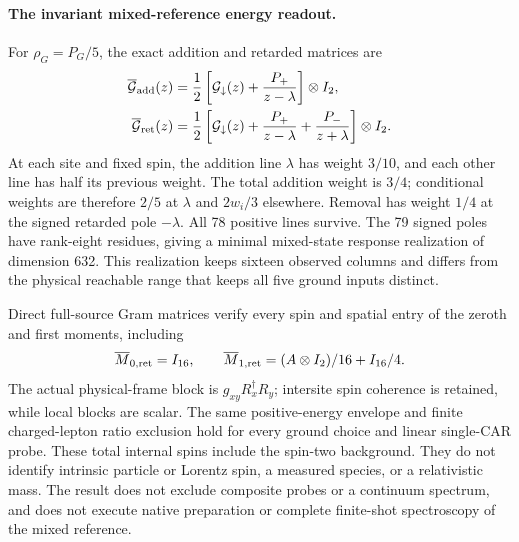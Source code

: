 \paragraph{The invariant mixed-reference energy readout.}
For $\rho_G=P_G/5$, the exact addition and retarded matrices are
\begin{align*}
 \overline{\mathcal G}_{\rm add}(z)
 &=\frac12\left[\mathcal G_\downarrow(z)
                   +\frac{P_+}{z-\lambda}\right]\otimes I_2,\\
 \overline{\mathcal G}_{\rm ret}(z)
 &=\frac12\left[\mathcal G_\downarrow(z)
                   +\frac{P_+}{z-\lambda}
                   +\frac{P_-}{z+\lambda}\right]\otimes I_2.
\end{align*}
At each site and fixed spin, the addition line $\lambda$ has weight
$3/10$, and each other line has half its previous weight.
The total addition weight is $3/4$; conditional weights are therefore
$2/5$ at $\lambda$ and $2w_i/3$ elsewhere.  Removal has weight $1/4$
at the signed retarded pole $-\lambda$.  All 78 positive lines survive.
The 79 signed poles have rank-eight residues, giving a minimal
mixed-state response realization of dimension 632.  This realization
keeps sixteen observed columns and differs from the physical reachable
range that keeps all five ground inputs distinct.

Direct full-source Gram matrices verify every spin and spatial entry
of the zeroth and first moments, including
\[
 \overline M_{0,\rm ret}=I_{16},\qquad
 \overline M_{1,\rm ret}=(A\otimes I_2)/16+I_{16}/4.
\]
The actual physical-frame block is $g_{xy}R_x^\dagger R_y$;
intersite spin coherence is retained, while local blocks are scalar.
The same positive-energy envelope and finite charged-lepton ratio
exclusion hold for every ground choice and linear single-CAR probe.
These total internal spins include the spin-two background.  They do
not identify intrinsic particle or Lorentz spin, a measured species, or
a relativistic mass.  The result does not exclude composite probes or a
continuum spectrum, and does not execute native preparation or complete
finite-shot spectroscopy of the mixed reference.
